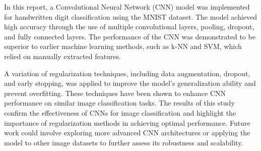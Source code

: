 In this report, a Convolutional Neural Network (CNN) model was implemented for handwritten 
digit classification using the MNIST dataset. The model achieved high accuracy through the 
use of multiple convolutional layers, pooling, dropout, and fully connected layers. The 
performance of the CNN was demonstrated to be superior to earlier machine learning 
methods, such as k-NN and SVM, which relied on manually extracted features.

A variation of regularization techniques, including data augmentation, dropout, and early 
stopping, was applied to improve the model's generalization ability and prevent 
overfitting. These techniques have been shown to enhance CNN performance on similar image 
classification tasks. The results of this study confirm the effectiveness of CNNs for image 
classification and highlight the importance of regularization methods in achieving optimal 
performance. Future work could involve exploring more advanced CNN architectures or 
applying the model to other image datasets to further assess its robustness and scalability.
